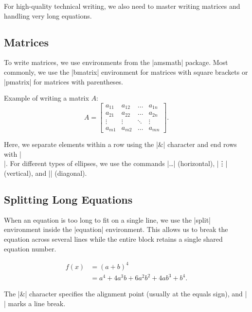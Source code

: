 \documentclass[9pt]{style/friteza}
\begin{document}
For high-quality technical writing, we also need to master writing matrices and handling very long equations.

\subsection{Matrices}

To write matrices, we use environments from the \ltx|amsmath| package. Most commonly, we use the \ltx|bmatrix| environment for matrices with square brackets or \ltx|pmatrix| for matrices with parentheses.

Example of writing a matrix $A$:
\begin{equation}
    A = \begin{bmatrix}
        a_{11} & a_{12} & \dots  & a_{1n} \\
        a_{21} & a_{22} & \dots  & a_{2n} \\
        \vdots & \vdots & \ddots & \vdots \\
        a_{m1} & a_{m2} & \dots  & a_{mn}
    \end{bmatrix}.
\end{equation}

Here, we separate elements within a row using the \ltx|\&| character and end rows with \ltx|\\|. For different types of ellipses, we use the commands \ltx|\dots| (horizontal), \ltx|\vdots| (vertical), and \ltx|\ddots| (diagonal).

\subsection{Splitting Long Equations}

When an equation is too long to fit on a single line, we use the \ltx|split| environment inside the \ltx|equation| environment. This allows us to break the equation across several lines while the entire block retains a single shared equation number.

\begin{equation}
    \begin{split}
        f(x) &= (a+b)^4 \\
             &= a^4 + 4a^3b + 6a^2b^2 + 4ab^3 + b^4.
    \end{split}
    \label{eq:razcep}
\end{equation}

The \ltx|\&| character specifies the alignment point (usually at the equals sign), and \ltx|\\| marks a line break.
\end{document}
